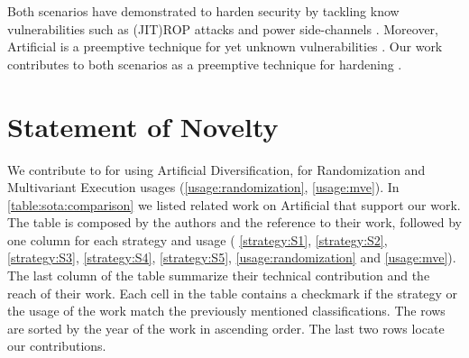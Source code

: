 Both scenarios have demonstrated to harden security by tackling know vulnerabilities such as (JIT)ROP attacks \cite{jackson2011compiler} and power side-channels \cite{amarilli2011can}. Moreover, Artificial is a preemptive technique for yet unknown vulnerabilities \cite{jackson}. Our work contributes to both scenarios as a preemptive technique for hardening \wasm.






\section{Statement of Novelty}
\label{sota:novelty}

We contribute to for \wasm using Artificial Diversification, for Randomization and Multivariant Execution usages (\autoref{usage:randomization}, \autoref{usage:mve}). 
In \autoref{table:sota:comparison} we listed related work on Artificial that support our work. The table is composed by the authors and the reference to their work, followed by one column for each strategy and usage ( \autoref{strategy:S1},  \autoref{strategy:S2},  \autoref{strategy:S3},  \autoref{strategy:S4},  \autoref{strategy:S5}, \autoref{usage:randomization} and \autoref{usage:mve}). The last column of the table summarize their technical contribution and the reach of their work. Each cell in the table contains a checkmark if the strategy or the usage of the work match the previously mentioned classifications. The rows are sorted by the year of the work in ascending order. The last two rows locate our contributions. 

